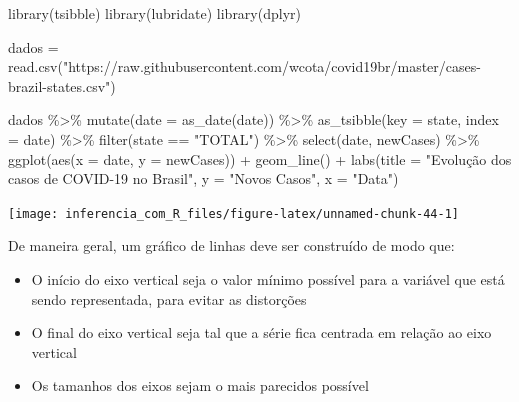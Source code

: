 \documentclass[
]{book}
\newenvironment{Shaded}{\begin{snugshade}}{\end{snugshade}}
\newcommand{\AttributeTok}[1]{\textcolor[rgb]{0.77,0.63,0.00}{#1}}
\newcommand{\FunctionTok}[1]{\textcolor[rgb]{0.00,0.00,0.00}{#1}}
\newcommand{\NormalTok}[1]{#1}
\newcommand{\OtherTok}[1]{\textcolor[rgb]{0.56,0.35,0.01}{#1}}
\newcommand{\SpecialCharTok}[1]{\textcolor[rgb]{0.00,0.00,0.00}{#1}}
\newcommand{\StringTok}[1]{\textcolor[rgb]{0.31,0.60,0.02}{#1}}
\providecommand{\tightlist}{%
  \setlength{\itemsep}{0pt}\setlength{\parskip}{0pt}}
\begin{document}
\begin{Shaded}
\begin{Highlighting}[]
\FunctionTok{library}\NormalTok{(tsibble)}
\FunctionTok{library}\NormalTok{(lubridate)}
\FunctionTok{library}\NormalTok{(dplyr)}

\NormalTok{dados }\OtherTok{=} \FunctionTok{read.csv}\NormalTok{(}\StringTok{"https://raw.githubusercontent.com/wcota/covid19br/master/cases{-}brazil{-}states.csv"}\NormalTok{)}

\NormalTok{dados }\SpecialCharTok{\%\textgreater{}\%}
  \FunctionTok{mutate}\NormalTok{(}\AttributeTok{date =} \FunctionTok{as\_date}\NormalTok{(date)) }\SpecialCharTok{\%\textgreater{}\%} 
  \FunctionTok{as\_tsibble}\NormalTok{(}\AttributeTok{key =}\NormalTok{ state, }\AttributeTok{index =}\NormalTok{ date) }\SpecialCharTok{\%\textgreater{}\%} 
  \FunctionTok{filter}\NormalTok{(state }\SpecialCharTok{==} \StringTok{"TOTAL"}\NormalTok{) }\SpecialCharTok{\%\textgreater{}\%} 
  \FunctionTok{select}\NormalTok{(date, newCases) }\SpecialCharTok{\%\textgreater{}\%}
  \FunctionTok{ggplot}\NormalTok{(}\FunctionTok{aes}\NormalTok{(}\AttributeTok{x =}\NormalTok{ date, }\AttributeTok{y =}\NormalTok{ newCases)) }\SpecialCharTok{+}
  \FunctionTok{geom\_line}\NormalTok{() }\SpecialCharTok{+}
  \FunctionTok{labs}\NormalTok{(}\AttributeTok{title =} \StringTok{"Evolução dos casos de COVID{-}19 no Brasil"}\NormalTok{,}
       \AttributeTok{y =} \StringTok{"Novos Casos"}\NormalTok{, }\AttributeTok{x =} \StringTok{"Data"}\NormalTok{)}
\end{Highlighting}
\end{Shaded}

\begin{center}\texttt{[image: inferencia\_com\_R\_files/figure-latex/unnamed-chunk-44-1]} \end{center}

De maneira geral, um gráfico de linhas deve ser construído de modo que:

\begin{itemize}
\tightlist
\item
  O início do eixo vertical seja o valor mínimo possível para a variável que está sendo representada, para evitar as distorções
\item
  O final do eixo vertical seja tal que a série fica centrada em relação ao eixo vertical
\item
  Os tamanhos dos eixos sejam o mais parecidos possível
\end{itemize}
\end{document}
